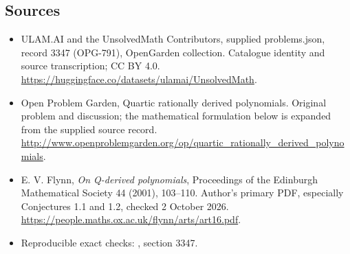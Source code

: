 \documentclass[11pt,a4paper]{article}
\begin{document}
\subsection{Sources}
\begin{itemize}
\item[S1] ULAM.AI and the UnsolvedMath Contributors, supplied problems.json, record 3347 (OPG-791), OpenGarden collection. Catalogue identity and source transcription; CC BY 4.0.
\url{https://huggingface.co/datasets/ulamai/UnsolvedMath}.
\item[S2] Open Problem Garden, Quartic rationally derived polynomials. Original problem and discussion; the mathematical formulation below is expanded from the supplied source record.
\url{http://www.openproblemgarden.org/op/quartic_rationally_derived_polynomials}.

\item[R1] E. V. Flynn, \emph{On Q-derived polynomials}, Proceedings of
the Edinburgh Mathematical Society 44 (2001), 103--110. Author's
primary PDF, especially Conjectures 1.1 and 1.2, checked 2 October 2026.
\url{https://people.maths.ox.ac.uk/flynn/arts/art16.pdf}.
\item[R2] Reproducible exact checks:
, section 3347.

\end{itemize}
\end{document}
